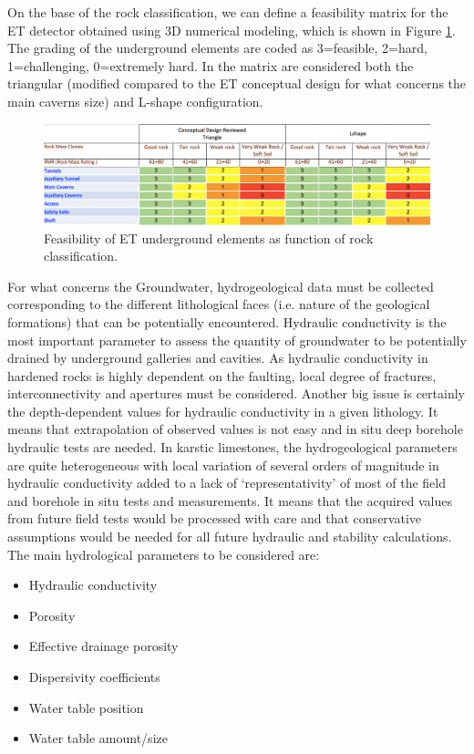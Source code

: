 On the base of the rock classification, we can define a feasibility matrix for the ET detector obtained using 3D numerical modeling, which is shown in Figure \ref{tab:rockclass}. The grading of the underground elements are coded as 3=feasible, 2=hard, 1=challenging, 0=extremely hard. In the matrix are considered both the triangular (modified compared to the ET conceptual design for what concerns the main caverns size) and L-shape configuration.
\begin{figure}[h!]
	\centering
		\includegraphics[width=\textwidth]{SiteInfra/SiteInfraFigures/RockClassTable.png}
		\caption{Feasibility of ET underground elements as function of rock classification.}
		\label{tab:rockclass}
\end{figure}
For what concerns the Groundwater, hydrogeological data must be collected corresponding to the different lithological faces (i.e. nature of the geological formations) that can be potentially encountered.  Hydraulic conductivity is the most important parameter to assess the quantity of groundwater to be potentially drained by underground galleries and cavities. As hydraulic conductivity in hardened rocks is highly dependent on the faulting, local degree of fractures, interconnectivity and apertures must be considered. Another big issue is certainly the depth-dependent values for hydraulic conductivity in a given lithology. It means that extrapolation of observed values is not easy and in situ deep borehole hydraulic tests are needed. In karstic limestones, the hydrogeological parameters are quite heterogeneous with local variation of several orders of magnitude in hydraulic conductivity added to a lack of ‘representativity’ of most of the field and borehole in situ tests and measurements. It means that the acquired values from future field tests would be processed with care and that conservative assumptions would be needed for all future hydraulic and stability calculations. The main hydrological parameters to be considered are:
\begin{itemize}
\item	Hydraulic conductivity
\item	Porosity
\item	Effective drainage porosity
\item	Dispersivity coefficients
\item	Water table position 
\item	Water table amount/size
\end{itemize}

